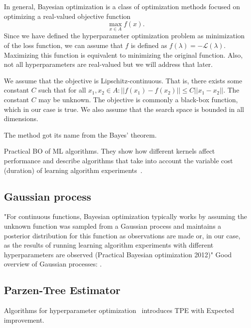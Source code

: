 In general, Bayesian optimization is a class of optimization methods focused on optimizing a real-valued objective function \[ \max_{x\in A} f(x). \]
Since we have defined the hyperparameter optimization problem as minimization of the loss function, we can assume that $f$ is defined as $f(\lambda)=-\mathcal{L}(\lambda)$. Maximizing this function is equivalent to minimizing the original function. Also, not all hyperparameters are real-valued but we will address that later.

We assume that the objective is Lipschitz-continuous. That is, there exists some constant $C$ such that for all $x_1,x_2\in A: ||f(x_1)-f(x_2)|| \leq C||x_1-x_2||$. The constant $C$ may be unknown. The objective is commonly a black-box function, which in our case is true. We also assume that the search space is bounded in all dimensions.

The method got its name from the Bayes' theorem.

Practical BO of ML algorithms. They show how different kernels affect performance and describe algorithms that take into account the variable cost (duration) of learning algorithm experiments~\cite{snoek2012practical}.


\subsection{Gaussian process}
"For continuous functions, Bayesian optimization typically works by assuming the unknown function was sampled from a Gaussian process and maintains a posterior distribution for this function as observations are made or, in our case, as the results of running learning algorithm experiments with different hyperparameters are observed (Practical Bayesian optimization 2012)"
Good overview of Gaussian processes: \cite{brochu2010tutorial}.


\subsection{Parzen-Tree Estimator}

Algorithms for hyperparameter optimization~\cite{bergstra2011algorithms} introduces TPE with Expected improvement.




